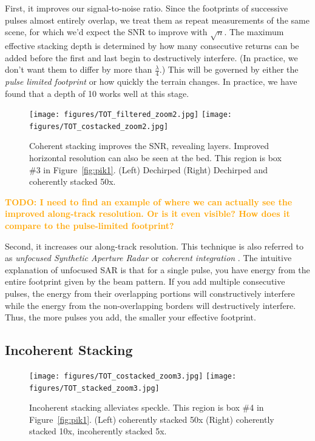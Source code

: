 \documentclass[11pt]{article}
\newcommand{\future}[1]{\ifthenelse{\boolean{include-future}} {\textcolor{Orange}{\textbf{TODO: #1}}}{}}
\newcommand{\figref}[1]{Figure~\ref{#1}}
\begin{document}
First, it improves our signal-to-noise ratio. 
Since the footprints of successive pulses almost entirely overlap, we treat them as repeat measurements of the same scene, for which we'd expect the SNR to improve with $\sqrt{n}$. The maximum effective stacking depth is determined by how many consecutive returns can be added before the first and last begin to destructively interfere. (In practice, we don't want them to differ by more than $\frac{\lambda}{4}$.) This will be governed by either the \emph{pulse limited footprint} or how quickly the terrain changes. In practice, we have found that a depth of 10 works well at this stage.

\begin{figure}[ht!]
\centering
\texttt{[image: figures/TOT\_filtered\_zoom2.jpg]}
\texttt{[image: figures/TOT\_costacked\_zoom2.jpg]}
\caption[]{Coherent stacking improves the SNR, revealing layers. Improved horizontal resolution can also be seen at the bed. This region is box \#3 in \figref{fig:pik1}. (Left) Dechirped (Right) Dechirped and coherently stacked 50x.}
\end{figure}

\future{I need to find an example of where we can actually see the improved along-track resolution. Or is it even visible? How does it compare to the pulse-limited footprint?}

Second, it increases our along-track resolution. This technique is also referred to as \emph{unfocused Synthetic Aperture Radar} or \emph{coherent integration} \cite{Peters2005}.
The intuitive explanation of unfocused SAR is that for a single pulse, you have energy from the entire footprint given by the beam pattern. 
If you add multiple consecutive pulses, the energy from their overlapping portions will constructively interfere while the energy from the non-overlapping borders will destructively interfere. 
Thus, the more pulses you add, the smaller your effective footprint. 

\subsection{Incoherent Stacking}

\begin{figure}[ht!]
\centering
\texttt{[image: figures/TOT\_costacked\_zoom3.jpg]}
\texttt{[image: figures/TOT\_stacked\_zoom3.jpg]}
\caption[]{Incoherent stacking alleviates speckle. This region is box \#4 in \figref{fig:pik1}. (Left) coherently stacked 50x (Right) coherently stacked 10x, incoherently stacked 5x.}
\label{fig:incoherent_stacking}
\end{figure}
\end{document}

